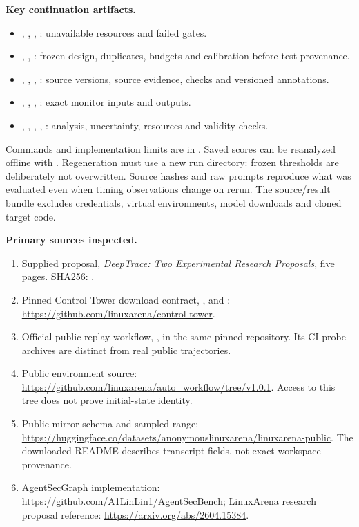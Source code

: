 \documentclass[10pt,letterpaper]{article}
\begin{document}
\textbf{Key continuation artifacts.}
\begin{itemize}
\item {}, , , : unavailable resources and failed gates.
\item {}, , : frozen design, duplicates, budgets and calibration-before-test provenance.
\item {}, , , : source versions, source evidence, checks and versioned annotations.
\item {}, , , : exact monitor inputs and outputs.
\item {}, , , , : analysis, uncertainty, resources and validity checks.
\end{itemize}

Commands and implementation limits are in . Saved scores can be reanalyzed offline with . Regeneration must use a new run directory: frozen thresholds are deliberately not overwritten. Source hashes and raw prompts reproduce what was evaluated even when timing observations change on rerun. The source/result bundle excludes credentials, virtual environments, model downloads and cloned target code.

\textbf{Primary sources inspected.}
\begin{enumerate}
\item Supplied proposal, \emph{DeepTrace: Two Experimental Research Proposals}, five pages. SHA256: .
\item Pinned Control Tower download contract, , and : \url{https://github.com/linuxarena/control-tower}.
\item Official public replay workflow, , in the same pinned repository. Its CI probe archives are distinct from real public trajectories.
\item Public environment source: \url{https://github.com/linuxarena/auto_workflow/tree/v1.0.1}. Access to this tree does not prove initial-state identity.
\item Public mirror schema and sampled range: \url{https://huggingface.co/datasets/anonymouslinuxarena/linuxarena-public}. The downloaded README describes transcript fields, not exact workspace provenance.
\item AgentSecGraph implementation: \url{https://github.com/A1LinLin1/AgentSecBench}; LinuxArena research proposal reference: \url{https://arxiv.org/abs/2604.15384}.
\end{enumerate}
\end{document}
